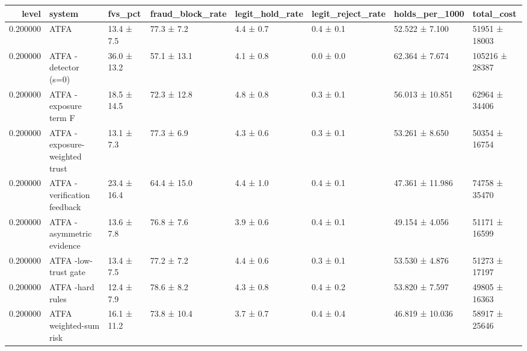 \begin{tabular}{rlllllll}
\toprule
level & system & fvs\_pct & fraud\_block\_rate & legit\_hold\_rate & legit\_reject\_rate & holds\_per\_1000 & total\_cost \\
\midrule
0.200000 & ATFA & 13.4 ± 7.5 & 77.3 ± 7.2 & 4.4 ± 0.7 & 0.4 ± 0.1 & 52.522 ± 7.100 & 51951 ± 18003 \\
0.200000 & ATFA -detector (s=0) & 36.0 ± 13.2 & 57.1 ± 13.1 & 4.1 ± 0.8 & 0.0 ± 0.0 & 62.364 ± 7.674 & 105216 ± 28387 \\
0.200000 & ATFA -exposure term F & 18.5 ± 14.5 & 72.3 ± 12.8 & 4.8 ± 0.8 & 0.3 ± 0.1 & 56.013 ± 10.851 & 62964 ± 34406 \\
0.200000 & ATFA -exposure-weighted trust & 13.1 ± 7.3 & 77.3 ± 6.9 & 4.3 ± 0.6 & 0.3 ± 0.1 & 53.261 ± 8.650 & 50354 ± 16754 \\
0.200000 & ATFA -verification feedback & 23.4 ± 16.4 & 64.4 ± 15.0 & 4.4 ± 1.0 & 0.4 ± 0.1 & 47.361 ± 11.986 & 74758 ± 35470 \\
0.200000 & ATFA -asymmetric evidence & 13.6 ± 7.8 & 76.8 ± 7.6 & 3.9 ± 0.6 & 0.4 ± 0.1 & 49.154 ± 4.056 & 51171 ± 16599 \\
0.200000 & ATFA -low-trust gate & 13.4 ± 7.5 & 77.2 ± 7.2 & 4.4 ± 0.6 & 0.3 ± 0.1 & 53.530 ± 4.876 & 51273 ± 17197 \\
0.200000 & ATFA -hard rules & 12.4 ± 7.9 & 78.6 ± 8.2 & 4.3 ± 0.8 & 0.4 ± 0.2 & 53.820 ± 7.597 & 49805 ± 16363 \\
0.200000 & ATFA weighted-sum risk & 16.1 ± 11.2 & 73.8 ± 10.4 & 3.7 ± 0.7 & 0.4 ± 0.4 & 46.819 ± 10.036 & 58917 ± 25646 \\
\bottomrule
\end{tabular}
